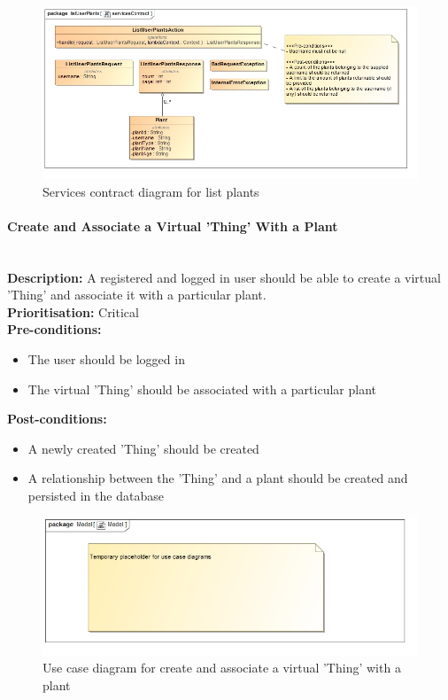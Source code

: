 \documentclass{article}
\begin{document}
		\begin{figure}[H]
			\includegraphics[width=\linewidth]{images/ServicesContracts/listUserPlants.jpg}
			\caption{Services contract diagram for list plants}
		\end{figure}
	
	\paragraph{Create and Associate a Virtual 'Thing' With a Plant}\mbox{}\\
		\textbf{Description:} A registered and logged in user should be able to create a virtual 'Thing' and associate it with a particular plant.\\
		\textbf{Prioritisation:} Critical\\		
		\textbf{Pre-conditions:}
			\begin{itemize}
				\item The user should be logged in
				\item The virtual 'Thing' should be associated with a particular plant
			\end{itemize}
		\textbf{Post-conditions:}
			\begin{itemize}
				\item A newly created 'Thing' should be created
				\item A relationship between the 'Thing' and a plant should be created and persisted in the database
			\end{itemize}

		\begin{figure}[H]
			\includegraphics[width=\linewidth]{images/tempUseCase.jpg}
			\caption{Use case diagram for create and associate a virtual 'Thing' with a plant}
		\end{figure}
		
\end{document}
